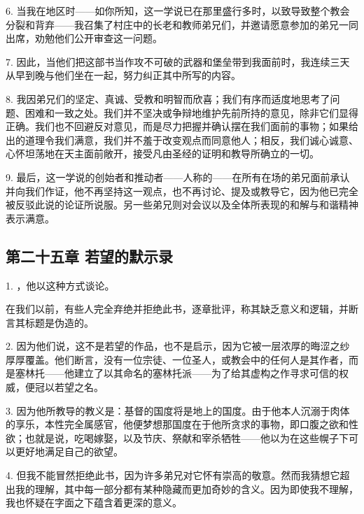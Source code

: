 6. 当我在地区时——如你所知，这一学说已在那里盛行多时，以致导致整个教会分裂和背弃——我召集了村庄中的长老和教师弟兄们，并邀请愿意参加的弟兄一同出席，劝勉他们公开审查这一问题。\par

7. 因此，当他们把这部书当作攻不可破的武器和堡垒带到我面前时，我连续三天从早到晚与他们坐在一起，努力纠正其中所写的内容。\par

8. 我因弟兄们的坚定、真诚、受教和明智而欣喜；我们有序而适度地思考了问题、困难和一致之处。我们并不坚决或争辩地维护先前所持的意见，除非它们显得正确。我们也不回避反对意见，而是尽力把握并确认摆在我们面前的事物；如果给出的道理令我们满意，我们并不羞于改变观点而同意他人；相反，我们诚心诚意、心怀坦荡地在天主面前敞开，接受凡由圣经的证明和教导所确立的一切。\par

9. 最后，这一学说的创始者和推动者——人称的——在所有在场的弟兄面前承认并向我们作证，他不再坚持这一观点，也不再讨论、提及或教导它，因为他已完全被反驳此说的论证所说服。另一些弟兄则对会议以及全体所表现的和解与和谐精神表示满意。\par


\subsection{第二十五章 若望的默示录}

1. ，他以这种方式谈论。\par

在我们以前，有些人完全弃绝并拒绝此书，逐章批评，称其缺乏意义和逻辑，并断言其标题是伪造的。\par

2. 因为他们说，这不是若望的作品，也不是启示，因为它被一层浓厚的晦涩之纱厚厚覆盖。他们断言，没有一位宗徒、一位圣人，或教会中的任何人是其作者，而是塞林托——他建立了以其命名的塞林托派——为了给其虚构之作寻求可信的权威，便冠以若望之名。\par

3. 因为他所教导的教义是：基督的国度将是地上的国度。由于他本人沉溺于肉体的享乐，本性完全属感官，他便梦想那国度在于他所贪求的事物，即口腹之欲和性欲；也就是说，吃喝嫁娶，以及节庆、祭献和宰杀牺牲——他以为在这些幌子下可以更好地满足自己的欲望。\par

4. 但我不能冒然拒绝此书，因为许多弟兄对它怀有崇高的敬意。然而我猜想它超出我的理解，其中每一部分都有某种隐藏而更加奇妙的含义。因为即使我不理解，我也怀疑在字面之下蕴含着更深的意义。\par

